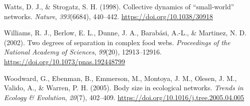 \documentclass[preprint, 3p,
authoryear]{elsarticle} %
\newlength{\cslhangindent}
\newlength{\cslentryspacingunit} %
\newenvironment{CSLReferences}[2] %
 {%
  \setlength{\parindent}{0pt}
  \ifodd #1
  \let\oldpar\par
  \def\par{\hangindent=\cslhangindent\oldpar}
  \fi
  \setlength{\parskip}{#2\cslentryspacingunit}
 }%
 {}
\begin{document}
\begin{CSLReferences}{1}{0}
\leavevmode{}%
Watts, D. J., \& Strogatz, S. H. (1998). Collective dynamics of
{``small-world''} networks. \emph{Nature}, \emph{393}(6684), 440--442.
\url{https://doi.org/10.1038/30918}

\leavevmode{}%
Williams, R. J., Berlow, E. L., Dunne, J. A., Barabási, A.-L., \&
Martinez, N. D. (2002). Two degrees of separation in complex food webs.
\emph{Proceedings of the National Academy of Sciences}, \emph{99}(20),
12913--12916. \url{https://doi.org/10.1073/pnas.192448799}

\leavevmode{}%
Woodward, G., Ebenman, B., Emmerson, M., Montoya, J. M., Olesen, J. M.,
Valido, A., \& Warren, P. H. (2005). Body size in ecological networks.
\emph{Trends in Ecology \& Evolution}, \emph{20}(7), 402--409.
\url{https://doi.org/10.1016/j.tree.2005.04.005}

\end{CSLReferences}
\end{document}

